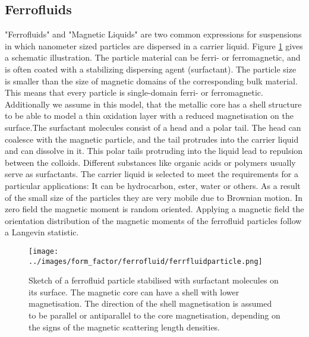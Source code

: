 \clearpage
\subsection{Ferrofluids} \hspace{1pt}
\label{sec:ferrofluid}

"Ferrofluids" and "Magnetic Liquids" are two common expressions for
suspensions in which nanometer sized particles are dispersed in a
carrier liquid. Figure \ref{fig:ferrofluidparticle} gives a
schematic illustration. The particle material can be ferri- or
ferromagnetic, and is often coated with a stabilizing dispersing
agent (surfactant). The particle size is smaller than the size of
magnetic domains of the corresponding bulk material. This means that
every particle is single-domain ferri- or ferromagnetic.
Additionally we assume in this model, that the metallic core has a
shell structure to be able to model a thin oxidation layer with a
reduced magnetisation on the surface.The surfactant molecules
consist of a head and a polar tail. The head can coalesce with the
magnetic particle, and the tail protrudes into the carrier liquid
and can dissolve in it. This polar tails protruding into the liquid
lead to repulsion between the colloids. Different substances like
organic acids or polymers usually serve as surfactants. The carrier
liquid is selected to meet the requirements for a particular
applications: It can be hydrocarbon, ester, water or others. As a
result of the small size of the particles they are very mobile due
to Brownian motion. In zero field the magnetic moment is random
oriented. Applying a magnetic field the orientation distribution of
the magnetic moments of the ferrofluid particles follow a Langevin
statistic.

\begin{figure}[htb]
\begin{center}
\texttt{[image: ../images/form\_factor/ferrofluid/ferrfluidparticle.png]}
\end{center}
\caption{Sketch of a ferrofluid particle stabilised with surfactant
molecules on its surface. The magnetic core can have a shell with
lower magnetisation. The direction of the shell magnetisation is
assumed to be parallel or antiparallel to the core magnetisation,
depending on the signs of the magnetic scattering length densities.}
\label{fig:ferrofluidparticle}
\end{figure}

